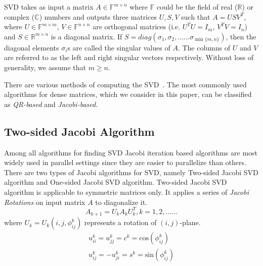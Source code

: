\documentclass[10pt, conference, compsocconf]{IEEEtran}
\begin{document}
SVD takes as input a matrix $A \in \mathbb{F}^{m \times n}$ where $\mathbb{F}$ could be the field of real ($\mathbb{R}$) or complex ($\mathbb{C}$) numbers and outputs three matrices $U, S, V$ such that $A = USV^T$, where $U \in \mathbb{F}^{m \times m}$, $V \in \mathbb{F}^{n \times n}$ are orthogonal matrices (i.e. $U^TU = I_m$, $V^TV = I_n$) and $S \in \mathbb{R}^{m \times n}$ is a diagonal matrix. If $S = diag(\sigma_1, \sigma_2,......\sigma_{\min\{m,n\}})$, then the diagonal elements $\sigma_i$s are called the singular values of $A$. The columns of $U$ and $V$ are referred to as the left and right singular vectors respectively. Without loss of generality, we assume that $m \ge n$. 

There are various methods of computing the SVD~\cite{golub2012matrix}. The most commonly used algorithms for dense matrices, which we consider in this paper, can be classified as \emph{QR-based} and \emph{Jacobi-based}.


\subsection{Two-sided Jacobi Algorithm}

\par Among all algorithms for finding SVD Jacobi iteration based algorithms are most widely used in parallel settings since they are easier to parallelize than others. There are two types of Jacobi algorithms for SVD, namely Two-sided Jacobi SVD algorithm and One-sided Jacobi SVD algorithm. Two-sided Jacobi SVD algorithm is applicable to symmetric matrices only. It applies a series of \textit{Jacobi Rotations} on input matrix $A$ to diagonalize it. 
\[
A_{k+1} = U_kA_kU_k^T, k =1,2,......
\]   
where $U_k = U_k(i,j,\phi^k_{ij})$ represents a rotation of $(i,j)$-plane. 
\begin{gather}
u_{ii}^k = u_{jj}^k = c^k = \text{cos}(\phi^k_{ij}) \\
u_{ij}^k = -u_{ji}^k = s^k = \text{sin}(\phi^k_{ij}) 
\end{gather}
\end{document}
